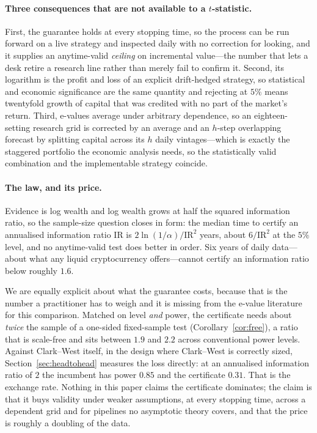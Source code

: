 \documentclass{article}
\theoremstyle{plain}
\theoremstyle{definition}
\begin{document}
\paragraph{Three consequences that are not available to a $t$-statistic.} First, the
guarantee holds at every stopping time, so the process can be run forward on a live strategy
and inspected daily with no correction for looking, and it supplies an anytime-valid
\emph{ceiling} on incremental value---the number that lets a desk retire a research line
rather than merely fail to confirm it. Second, its logarithm is the profit and loss of an
explicit drift-hedged strategy, so statistical and economic significance are the same
quantity and rejecting at $5\%$ means twentyfold growth of capital that was credited with no
part of the market's return. Third, e-values average under arbitrary dependence, so an
eighteen-setting research grid is corrected by an average and an $h$-step overlapping
forecast by splitting capital across its $h$ daily vintages---which is exactly the staggered
portfolio the economic analysis needs, so the statistically valid combination and the
implementable strategy coincide.

\paragraph{The law, and its price.} Evidence is log wealth and log wealth grows at half the
squared information ratio, so the sample-size question closes in form: the median time to
certify an annualised information ratio $\mathrm{IR}$ is $2\ln(1/\alpha)/\mathrm{IR}^2$ years,
about $6/\mathrm{IR}^2$ at the $5\%$ level, and no anytime-valid test does better in order.
Six years of daily data---about what any liquid cryptocurrency offers---cannot certify an
information ratio below roughly $1.6$.

We are equally explicit about what the guarantee costs, because that is the number a
practitioner has to weigh and it is missing from the e-value literature for this comparison.
Matched on level \emph{and} power, the certificate needs about \emph{twice} the sample of a
one-sided fixed-sample test (Corollary~\ref{cor:free}), a ratio that is scale-free and sits
between $1.9$ and $2.2$ across conventional power levels. Against Clark--West itself, in the
design where Clark--West is correctly sized, Section~\ref{sec:headtohead} measures the loss
directly: at an annualised information ratio of $2$ the incumbent has power $0.85$ and the
certificate $0.31$. That is the exchange rate. Nothing in this paper claims the certificate
dominates; the claim is that it buys validity under weaker assumptions, at every stopping
time, across a dependent grid and for pipelines no asymptotic theory covers, and that the
price is roughly a doubling of the data.
\end{document}
